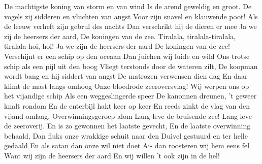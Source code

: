 \beginverse*
De machtigste koning van storm en van wind 
Is de arend geweldig en groot. 
De vogels zij sidderen en vluchten van angst 
Voor zijn snavel en klauwende poot! 
Als de leeuw verheft zijn gebrul des nachts 
Dan verschrikt hij de dieren er mee 
Ja we zij de heersers der aard,
De koningen van de zee.
\endverse
\beginchorus
Tiralala, tiralala-tiralala, tiralala hoi, hoi! 
Ja we zijn de heersers der aard 
De koningen van de zee! 
\endchorus
\beginverse*
Verschijnt er een schip op den oceaan 
Dan juichen wij luide en wild 
Ons trotse schip als een pijl uit den boog 
Vliegt terstonds door de wateren zilt, 
De koopman wordt bang en hij siddert van angst 
De matrozen verwensen dien dag 
En daar klimt de mast langs omhoog 
Onze bloedrode zeeroversvlag!
\endverse
\beginverse*
Wij werpen ons op het vijandige schip 
Als een weggeslingerde speer 
De kanonnen dreunen, ’t geweer knalt rondom
En de enterbijl hakt keer op keer
En reeds zinkt de vlag van den vijand omlaag. 
Overwinningsgeroep alom Lang leve de bruisende zee!
Lang leve de zeeroverij. 
\endverse
\beginverse*
En is zo gewonnen het laatste gevecht, 
En de laatste overwinning behaald, 
Dan fluks onze wrakkige schuit naar den 
Duivel gestuurd en ter helle gedaald 
En als satan dan onze wil niet doet Ai- dan roosteren wij hem eens fel 
Want wij zijn de heersers der aard 
En wij willen ’t ook zijn in de hel!
\endverse
\endsong